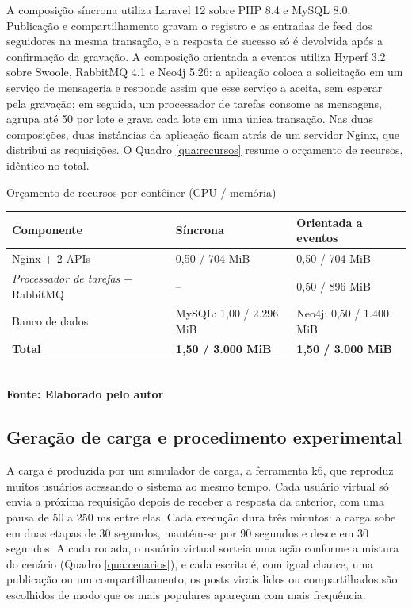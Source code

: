 A composição síncrona utiliza Laravel 12 sobre PHP 8.4 e MySQL 8.0. Publicação e compartilhamento gravam o registro e as entradas de feed dos seguidores na mesma transação, e a resposta de sucesso só é devolvida após a confirmação da gravação. A composição orientada a eventos utiliza Hyperf 3.2 sobre Swoole, RabbitMQ 4.1 e Neo4j 5.26: a aplicação coloca a solicitação em um serviço de mensageria e responde assim que esse serviço a aceita, sem esperar pela gravação; em seguida, um processador de tarefas consome as mensagens, agrupa até 50 por lote e grava cada lote em uma única transação. Nas duas composições, duas instâncias da aplicação ficam atrás de um servidor Nginx, que distribui as requisições. O Quadro \ref{qua:recursos} resume o orçamento de recursos, idêntico no total.

\begin{quadro}[H]
    \centering
    \caption{Orçamento de recursos por contêiner (CPU / memória)}
    \label{qua:recursos}
    \begin{tabular}{|C{3.6cm}|C{4.6cm}|C{4.6cm}|}
    \hline
    \textbf{Componente} & \textbf{Síncrona} & \textbf{Orientada a eventos} \\ \hline
    Nginx + 2 APIs & 0,50 / 704 MiB & 0,50 / 704 MiB \\ \hline
    \textit{Processador de tarefas} + RabbitMQ & -- & 0,50 / 896 MiB \\ \hline
    Banco de dados & MySQL: 1,00 / 2.296 MiB & Neo4j: 0,50 / 1.400 MiB \\ \hline
    \textbf{Total} & \textbf{1,50 / 3.000 MiB} & \textbf{1,50 / 3.000 MiB} \\ \hline
    \end{tabular}
    \vspace{.1cm}
    \small
    {\footnotesize\\ \textbf{Fonte: Elaborado pelo autor}}
\end{quadro}

\estrutura\subsection{\esp Geração de carga e procedimento experimental}

A carga é produzida por um simulador de carga, a ferramenta k6, que reproduz muitos usuários acessando o sistema ao mesmo tempo. Cada usuário virtual só envia a próxima requisição depois de receber a resposta da anterior, com uma pausa de 50 a 250 ms entre elas. Cada execução dura três minutos: a carga sobe em duas etapas de 30 segundos, mantém-se por 90 segundos e desce em 30 segundos. A cada rodada, o usuário virtual sorteia uma ação conforme a mistura do cenário (Quadro \ref{qua:cenarios}), e cada escrita é, com igual chance, uma publicação ou um compartilhamento; os posts virais lidos ou compartilhados são escolhidos de modo que os mais populares apareçam com mais frequência.

